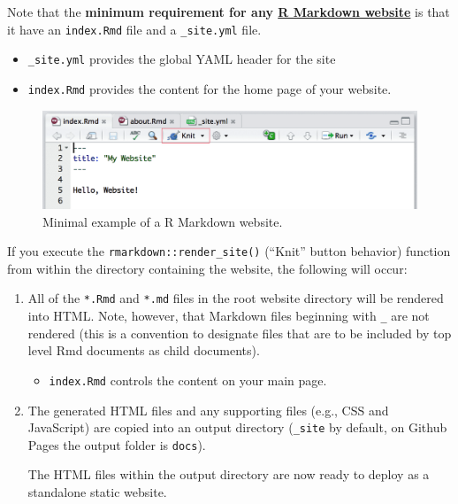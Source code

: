 \documentclass[
  a4paper,
  twoside,
  openright]{book}
\providecommand{\tightlist}{%
  \setlength{\itemsep}{0pt}\setlength{\parskip}{0pt}}
\theoremstyle{definition}
\theoremstyle{definition}
\theoremstyle{definition}
\theoremstyle{definition}
\theoremstyle{remark}
\begin{document}
Note that the \textbf{minimum requirement for any \href{https://bookdown.org/yihui/rmarkdown/rmarkdown-site.html}{R Markdown website}} is that it have an \texttt{index.Rmd} file and a \texttt{\_site.yml} file.

\begin{itemize}
\tightlist
\item
  \texttt{\_site.yml} provides the global YAML header for the site
\item
  \texttt{index.Rmd} provides the content for the home page of your website.
\end{itemize}

\begin{figure}
\includegraphics[width=16.69in]{images/site-page} \caption{Minimal example of a R Markdown website.}\label{fig:unnamed-chunk-1}
\end{figure}

If you execute the \texttt{rmarkdown::render\_site()} (``Knit'' button behavior) function from within the directory containing the website, the following will occur:

\begin{enumerate}
\def\labelenumi{\arabic{enumi}.}
\item
  All of the \texttt{*.Rmd} and \texttt{*.md} files in the root website directory will be rendered into HTML. Note, however, that Markdown files beginning with \texttt{\_} are not rendered (this is a convention to designate files that are to be included by top level Rmd documents as child documents).

  \begin{itemize}
  \tightlist
  \item
    \texttt{index.Rmd} controls the content on your main page.
  \end{itemize}
\item
  The generated HTML files and any supporting files (e.g., CSS and JavaScript) are copied into an output directory (\texttt{\_site} by default, on Github Pages the output folder is \texttt{docs}).

  The HTML files within the output directory are now ready to deploy as a standalone static website.
\end{enumerate}
\end{document}
